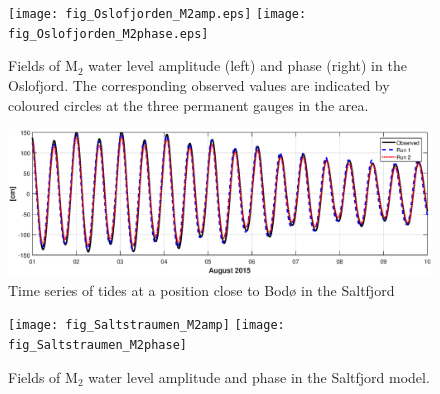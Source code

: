 \begin{figure}[!t]
\centering
\texttt{[image: fig\_Oslofjorden\_M2amp.eps]}
\texttt{[image: fig\_Oslofjorden\_M2phase.eps]}
\caption{Fields of M$_2$ water level amplitude (left) and phase (right) in the Oslofjord. The corresponding observed values are indicated by coloured circles at the three permanent gauges in the area.}
\label{fig:Oslofjord_tidal_fields}
\end{figure}


\begin{figure}[!t]
\centering
\includegraphics[width=\textwidth]{fig_Saltstraumen_timeseries}
\caption{Time series of tides at a position close to Bod{\o} in the Saltfjord}
\label{fig:Saltstraumen_timeseries}
\end{figure}


\begin{figure}[!t]
\centering
\texttt{[image: fig\_Saltstraumen\_M2amp]}
\texttt{[image: fig\_Saltstraumen\_M2phase]}
\caption{Fields of M$_2$ water level amplitude and phase in the Saltfjord model.}
\label{fig:Saltstraumen_field}
\end{figure}

